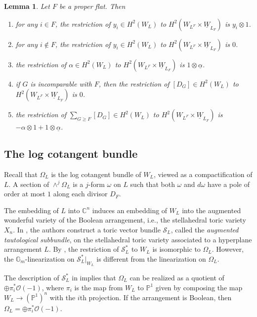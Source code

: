 \documentclass{amsart}
\newtheorem{lemma}[theorem]{Lemma}
\theoremstyle{definition}
\begin{document}
\begin{lemma}\label{lem:restrictToBoundary}\cite[Proposition 2.20]{BHMPW20a}
Let $F$ be a proper flat. Then
\begin{enumerate}
\item for any $i \in F$, the restriction of $y_i \in H^2(W_L)$ to $H^2(W_{L^F} \times \underline{W}_{L_F})$ is $y_i \otimes 1$. 
\item for any $i \not \in F$, the restriction of $y_i \in H^2(W_L)$ to $H^2(W_{L^F} \times \underline{W}_{L_F})$ is $0$. 
\item the restriction of $\alpha \in H^2(W_L)$ to $H^2(W_{L^F} \times \underline{W}_{L_F})$ is $1 \otimes \underline{\alpha}$.
\item if $G$ is incomparable with $F$, then the restriction of $[D_G] \in H^2(W_L)$ to $H^2(W_{L^F} \times \underline{W}_{L_F})$ is $0$. 
\item the restriction of $\sum_{G \ge F} [D_G] \in H^2(W_L)$ to $H^2(W_{L^F} \times \underline{W}_{L_F})$ is $-\alpha \otimes 1 + 1 \otimes \underline{\alpha}$. 
\end{enumerate}
\end{lemma}


\subsection{The log cotangent bundle}\label{ssec:logcotangent}

Recall that $\Omega_L$ is the log cotangent bundle of $W_L$, viewed as a compactification of $L$. A section of $\wedge^j \Omega_L$ is a $j$-form $\omega$ on $L$ such that both $\omega$ and $d\omega$ have a pole of order at most $1$ along each divisor $D_F$. 

The embedding of $L$ into $\mathbb{C}^n$ induces an embedding of $W_L$ into the augmented wonderful variety of the Boolean arrangement, i.e., the stellahedral toric variety $X_n$. 
In \cite{EHL}, the authors construct a toric vector bundle 
$\mathcal{S}_L$, called the \emph{augmented tautological subbundle}, on 
the stellahedral toric variety associated to a hyperplane arrangement $L$. By \cite[Theorem 9.2]{EHL}, the restriction of $\mathcal{S}_L^*$ to $W_L$ is isomorphic to $\Omega_L$. However, the $\mathbb{G}_m$-linearization on $\mathcal{S}_L^*|_{W_L}$ is different from the linearization on $\Omega_L$. 

The description of $\mathcal{S}_L^{*}$ in \cite{EHL} implies that $\Omega_L$ can be realized as a quotient of $\oplus \pi_i^* \mathcal{O}(-1)$, where $\pi_i$ is the map from $W_L$ to $\mathbb{P}^1$ given by composing the map $W_L \to (\mathbb{P}^1)^n$ with the $i$th projection. If the arrangement is Boolean, then $\Omega_L = \oplus \pi_i^* \mathcal{O}(-1)$. 
\end{document}

